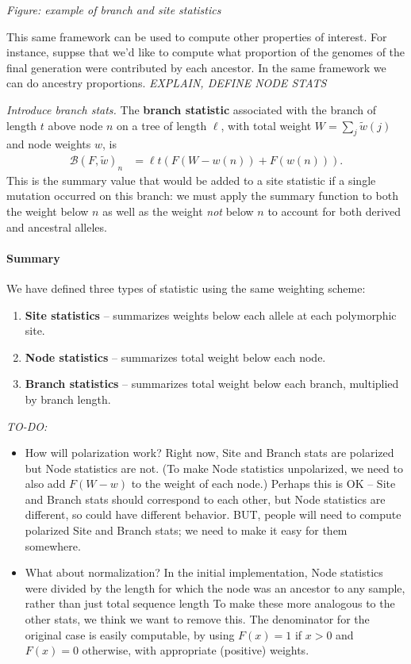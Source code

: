 \documentclass{article}
\newcommand{\branch}{\mathcal{B}} %
\newcommand{\nw}{{w}} %
\newcommand{\iw}{{\tilde w}} %
\newcommand{\Tw}{{W}} %
\newcommand{\plr}[1]{{\color{blue} \it #1}}
\begin{document}
\plr{Figure: example of branch and site statistics}

This same framework can be used to compute other properties of interest.
For instance, suppse that we'd like to compute
what proportion of the genomes of the final generation were contributed by each ancestor.
In the same framework we can do ancestry proportions.
\plr{EXPLAIN, DEFINE NODE STATS}

\plr{Introduce branch stats.}
The \textbf{branch statistic} associated with the branch of length $t$ 
above node $n$ on a tree of length $\ell$,
with total weight $\Tw = \sum_j \iw(j)$
and node weights $\nw$,
is
\begin{align}
    \branch(F, \iw)_n
    &=
    \ell t ( F(\Tw - \nw(n)) + F(\nw(n)) ) .
\end{align}
This is the summary value that would be added to a site statistic 
if a single mutation occurred on this branch:
we must apply the summary function 
to both the weight below $n$ as well as the weight \emph{not} below $n$
to account for both derived and ancestral alleles.

\paragraph{Summary}
We have defined three types of statistic using the same weighting scheme:
\begin{enumerate}
    \item \textbf{Site statistics} 
        -- summarizes weights below each allele at each polymorphic site.
    \item \textbf{Node statistics} 
        -- summarizes total weight below each node.
    \item \textbf{Branch statistics}
        -- summarizes total weight below each branch, multiplied by branch length.
\end{enumerate}


\plr{TO-DO:} 
\begin{itemize}

    \item How will polarization work? 
        Right now, Site and Branch stats are polarized but Node statistics are not.
        (To make Node statistics unpolarized, we need to also add $F(\Tw - w)$ 
        to the weight of each node.)
        Perhaps this is OK -- Site and Branch stats should correspond to each other,
        but Node statistics are different, so could have different behavior.
        BUT, people will need to compute polarized Site and Branch stats;
        we need to make it easy for them somewhere.

    \item What about normalization?
        In the initial implementation, Node statistics were divided by the length
        for which the node was an ancestor to any sample, rather than just total sequence length
        To make these more analogous to the other stats, we think we want to remove this.
        The denominator for the original case is easily computable, by using 
        $F(x) = 1$ if $x>0$ and $F(x)=0$ otherwise, with appropriate (positive) weights.

\end{itemize}
\end{document}
